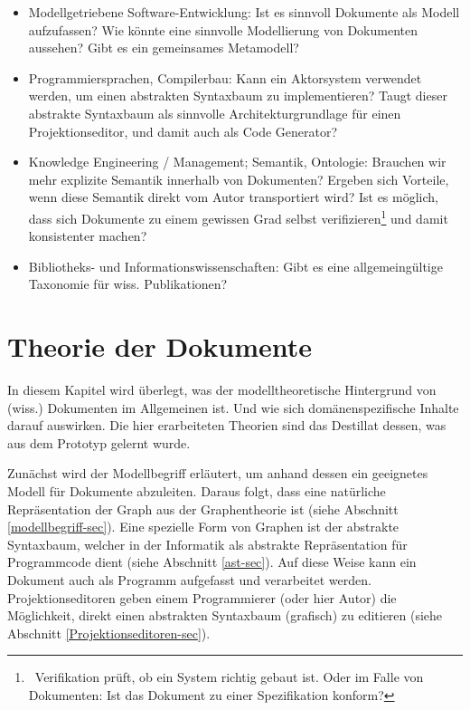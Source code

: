  
\begin{itemize}

\item
Modellgetriebene Software-Entwicklung: Ist es sinnvoll Dokumente als Modell aufzufassen? Wie könnte eine sinnvolle Modellierung von Dokumenten aussehen? Gibt es ein gemeinsames Metamodell?


\item
Programmiersprachen, Compilerbau: Kann ein Aktorsystem verwendet werden, um einen abstrakten Syntaxbaum zu implementieren? Taugt dieser abstrakte Syntaxbaum als sinnvolle Architekturgrundlage für einen Projektionseditor, und damit auch als Code Generator?


\item
Knowledge Engineering / Management; Semantik, Ontologie: Brauchen wir mehr explizite Semantik innerhalb von Dokumenten? Ergeben sich Vorteile, wenn diese Semantik direkt vom Autor transportiert wird? Ist es möglich, dass sich Dokumente zu einem gewissen Grad selbst verifizieren\footnote{~Verifikation prüft, ob ein System richtig gebaut ist. Oder im Falle von Dokumenten: Ist das Dokument zu einer Spezifikation konform?} und damit konsistenter machen?


\item
Bibliotheks- und Informationswissenschaften: Gibt es eine allgemeingültige Taxonomie für wiss. Publikationen?


\end{itemize}
 
\chapter{Theorie der Dokumente}\label{}
 
In diesem Kapitel wird überlegt, was der modelltheoretische Hintergrund von (wiss.) Dokumenten im Allgemeinen ist. Und wie sich domänenspezifische Inhalte darauf auswirken. Die hier erarbeiteten Theorien sind das Destillat dessen, was aus dem Prototyp gelernt wurde.

 
Zunächst wird der Modellbegriff erläutert, um anhand dessen ein geeignetes Modell für Dokumente abzuleiten. Daraus folgt, dass eine natürliche Repräsentation der Graph aus der Graphentheorie ist (siehe Abschnitt \ref{modellbegriff-sec}). Eine spezielle Form von Graphen ist der abstrakte Syntaxbaum, welcher in der Informatik als abstrakte Repräsentation für Programmcode dient (siehe Abschnitt \ref{ast-sec}). Auf diese Weise kann ein Dokument auch als Programm aufgefasst und verarbeitet werden. Projektionseditoren geben einem Programmierer (oder hier Autor) die Möglichkeit, direkt einen abstrakten Syntaxbaum (grafisch) zu editieren (siehe Abschnitt \ref{Projektionseditoren-sec}).

